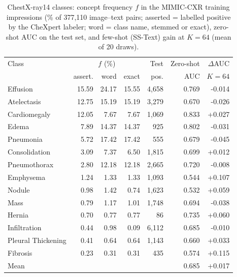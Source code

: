 \begin{table}[!t]
\centering
\footnotesize
\caption{ChestX-ray14 classes: concept frequency $f$ in the MIMIC-CXR training impressions (\% of 377{,}110
image--text pairs; asserted = labelled positive by the CheXpert labeler; word = class name, stemmed or exact),
zero-shot AUC on the test set, and few-shot (SS-Text) gain at $K=64$ (mean of 20 draws).}
\label{tab:classes}
\setlength{\tabcolsep}{3pt}
\begin{tabular}{lrrrrrr}
\toprule
Class & \multicolumn{3}{c}{$f$ (\%)} & Test & Zero-shot & $\Delta$AUC \\
 & assert. & word & exact & pos. & AUC & $K{=}64$ \\
\midrule
Effusion & 15.59 & 24.17 & 15.55 & 4,658 & 0.769 & -0.014 \\
Atelectasis & 12.75 & 15.19 & 15.19 & 3,279 & 0.670 & -0.026 \\
Cardiomegaly & 12.05 & 7.67 & 7.67 & 1,069 & 0.833 & +0.027 \\
Edema & 7.89 & 14.37 & 14.37 & 925 & 0.802 & -0.031 \\
Pneumonia & 5.72 & 17.42 & 17.42 & 555 & 0.679 & -0.045 \\
Consolidation & 3.09 & 7.37 & 6.50 & 1,815 & 0.699 & +0.012 \\
Pneumothorax & 2.80 & 12.18 & 12.18 & 2,665 & 0.720 & -0.008 \\
Emphysema & 1.24 & 1.33 & 1.33 & 1,093 & 0.544 & +0.107 \\
Nodule & 0.98 & 1.42 & 0.74 & 1,623 & 0.532 & +0.059 \\
Mass & 0.79 & 1.17 & 1.01 & 1,748 & 0.694 & -0.038 \\
Hernia & 0.70 & 0.77 & 0.77 & 86 & 0.735 & +0.060 \\
Infiltration & 0.44 & 0.98 & 0.09 & 6,112 & 0.685 & -0.010 \\
Pleural Thickening & 0.41 & 0.64 & 0.64 & 1,143 & 0.660 & +0.033 \\
Fibrosis & 0.23 & 0.31 & 0.31 & 435 & 0.574 & +0.115 \\
\midrule
Mean & & & & & 0.685 & +0.017 \\
\bottomrule
\end{tabular}
\end{table}
